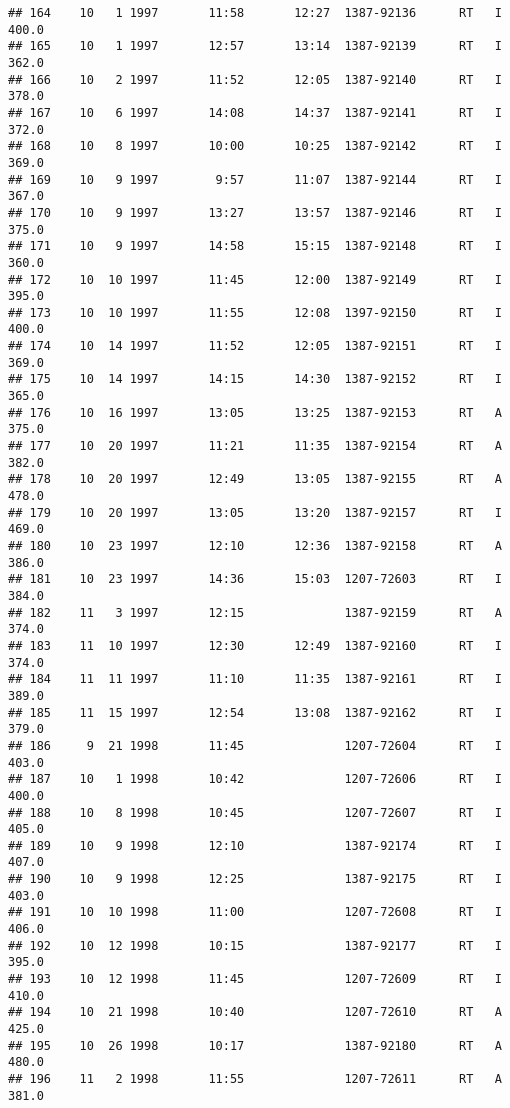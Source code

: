 \documentclass[
]{article}
\begin{document}
\begin{verbatim}
## 164    10   1 1997       11:58       12:27  1387-92136      RT   I     400.0
## 165    10   1 1997       12:57       13:14  1387-92139      RT   I     362.0
## 166    10   2 1997       11:52       12:05  1387-92140      RT   I     378.0
## 167    10   6 1997       14:08       14:37  1387-92141      RT   I     372.0
## 168    10   8 1997       10:00       10:25  1387-92142      RT   I     369.0
## 169    10   9 1997        9:57       11:07  1387-92144      RT   I     367.0
## 170    10   9 1997       13:27       13:57  1387-92146      RT   I     375.0
## 171    10   9 1997       14:58       15:15  1387-92148      RT   I     360.0
## 172    10  10 1997       11:45       12:00  1387-92149      RT   I     395.0
## 173    10  10 1997       11:55       12:08  1397-92150      RT   I     400.0
## 174    10  14 1997       11:52       12:05  1387-92151      RT   I     369.0
## 175    10  14 1997       14:15       14:30  1387-92152      RT   I     365.0
## 176    10  16 1997       13:05       13:25  1387-92153      RT   A     375.0
## 177    10  20 1997       11:21       11:35  1387-92154      RT   A     382.0
## 178    10  20 1997       12:49       13:05  1387-92155      RT   A     478.0
## 179    10  20 1997       13:05       13:20  1387-92157      RT   I     469.0
## 180    10  23 1997       12:10       12:36  1387-92158      RT   A     386.0
## 181    10  23 1997       14:36       15:03  1207-72603      RT   I     384.0
## 182    11   3 1997       12:15              1387-92159      RT   A     374.0
## 183    11  10 1997       12:30       12:49  1387-92160      RT   I     374.0
## 184    11  11 1997       11:10       11:35  1387-92161      RT   I     389.0
## 185    11  15 1997       12:54       13:08  1387-92162      RT   I     379.0
## 186     9  21 1998       11:45              1207-72604      RT   I     403.0
## 187    10   1 1998       10:42              1207-72606      RT   I     400.0
## 188    10   8 1998       10:45              1207-72607      RT   I     405.0
## 189    10   9 1998       12:10              1387-92174      RT   I     407.0
## 190    10   9 1998       12:25              1387-92175      RT   I     403.0
## 191    10  10 1998       11:00              1207-72608      RT   I     406.0
## 192    10  12 1998       10:15              1387-92177      RT   I     395.0
## 193    10  12 1998       11:45              1207-72609      RT   I     410.0
## 194    10  21 1998       10:40              1207-72610      RT   A     425.0
## 195    10  26 1998       10:17              1387-92180      RT   A     480.0
## 196    11   2 1998       11:55              1207-72611      RT   A     381.0

\end{verbatim}
\end{document}

